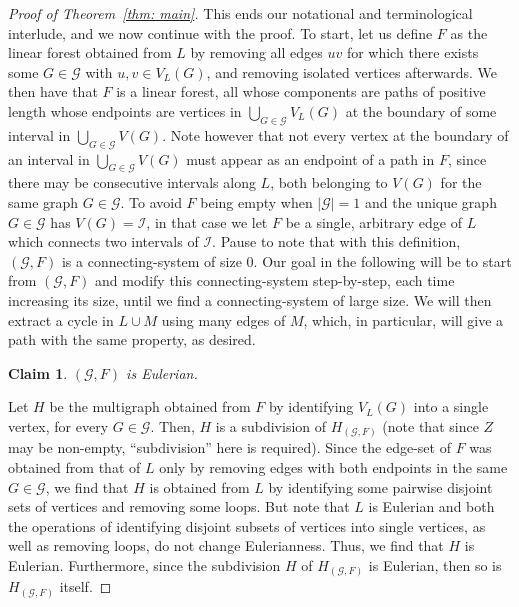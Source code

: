 \documentclass[11pt,reqno]{article}
\newtheorem{claim}[theorem]{Claim}
\newenvironment{claimproof}[1][\proofname]{\proof[#1]\renewcommand{\qedsymbol}{$\blacksquare$}}{\endproof}
\begin{document}
\begin{proof}[Proof of Theorem~\ref{thm: main}]
This ends our notational and terminological interlude, and we now continue with the proof. To start, let us define $F$ as the linear forest obtained from $L$ by removing all edges $uv$ for which there exists some $G\in\mathcal G$ with $u,v\in V_L(G)$, and removing isolated vertices afterwards. We then have that $F$ is a linear forest, all whose components are paths of positive length whose endpoints are vertices in $\bigcup_{G\in\mathcal{G}}V_L(G)$ at the boundary of some interval in $\bigcup_{G\in \mathcal{G}}V(G)$. Note however that not every vertex at the boundary of an interval in $\bigcup_{G\in \mathcal{G}}V(G)$ must appear as an endpoint of a path in $F$, since there may be consecutive intervals along $L$, both belonging to $V(G)$ for the same graph $G\in\mathcal G$. To avoid $F$ being empty when $|\mathcal G|=1$ and the unique graph $G\in\mathcal G$ has $V(G)=\mathcal I$, in that case we let $F$ be a single, arbitrary edge of $L$ which connects two intervals of $\mathcal I$. Pause to note that with this definition, $(\mathcal G,F)$ is a connecting-system of size $0$. Our goal in the following will be to start from $(\mathcal{G},F)$ and modify this connecting-system step-by-step, each time increasing its size, until we find a connecting-system of large size. We will then extract a cycle in $L\cup M$ using many edges of $M$, which, in particular, will give a path with the same property, as desired.
  \begin{claim}
      $(\mathcal G,F)$ is Eulerian.
  \end{claim}
  \begin{claimproof}
     Let $H$ be the multigraph obtained from $F$ by identifying $V_L(G)$ into a single vertex, for every $G\in\mathcal G$. Then, $H$ is a subdivision of $H_{(\mathcal G,F)}$ (note that since $Z$ may be non-empty, ``subdivision'' here is required).
     Since the edge-set of $F$ was obtained from that of $L$ only by removing edges with both endpoints in the same $G\in\mathcal G$, we find that $H$ is obtained from $L$ by identifying some pairwise disjoint sets of vertices and removing some loops. But note that $L$ is Eulerian and both the operations of identifying disjoint subsets of vertices into single vertices, as well as removing loops, do not change Eulerianness. Thus, we find that $H$ is Eulerian. Furthermore, since the subdivision $H$ of $H_{(\mathcal G,F)}$ is Eulerian, then so is $H_{(\mathcal G,F)}$ itself.
  \end{claimproof}

\end{proof}
\end{document}

